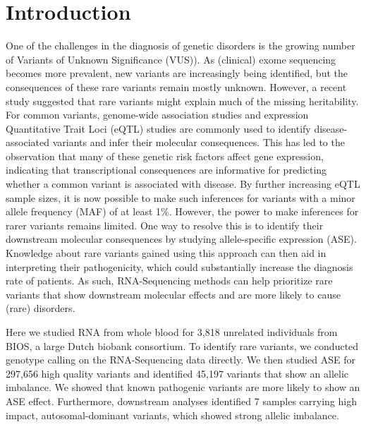 \section{Introduction}
One of the challenges in the diagnosis of genetic disorders is the growing number of Variants of Unknown Significance (VUS)\cite{hoffman-andrewsKnownUnknownChallenges2018,direstaNextgenerationSequencingApproach2018}). As (clinical) exome sequencing becomes more prevalent, new variants are increasingly being identified, but the consequences of these rare variants remain mostly unknown. However, a recent study suggested that rare variants might explain much of the missing heritability\cite{wainschteinRecoveryTraitHeritability2019}. For common variants, genome-wide association studies and expression Quantitative Trait Loci (eQTL) studies\cite{zhernakovaIdentificationContextdependentExpression2017,aguetGeneticEffectsGene2017,vosaUnravelingPolygenicArchitecture2018} are commonly used to identify disease-associated variants and infer their molecular consequences. This has led to the observation that many of these genetic risk factors affect gene expression, indicating that transcriptional consequences are informative for predicting whether a common variant is associated with disease. By further increasing eQTL sample sizes, it is now possible to make such inferences for variants with a minor allele frequency (MAF) of at least 1\%\cite{vosaUnravelingPolygenicArchitecture2018}. However, the power to make inferences for rarer variants remains limited. One way to resolve this is to identify their downstream molecular consequences by studying allele-specific expression (ASE)\cite{bombaImpactRareLowfrequency2017}. Knowledge about rare variants gained using this approach can then aid in interpreting their pathogenicity, which could substantially increase the diagnosis rate of patients\cite{macarthurGuidelinesInvestigatingCausality2014,kremerGeneticDiagnosisMendelian2017}. As such, RNA-Sequencing methods can help prioritize rare variants that show downstream molecular effects and are more likely to cause (rare) disorders.

Here we studied RNA from whole blood for 3,818 unrelated individuals from BIOS, a large Dutch biobank consortium. To identify rare variants, we conducted genotype calling on the RNA-Sequencing data directly. We then studied ASE for 297,656 high quality variants and identified 45,197 variants that show an allelic imbalance. We showed that known pathogenic variants are more likely to show an ASE effect. Furthermore, downstream analyses identified 7 samples carrying high impact, autosomal-dominant variants, which showed strong allelic imbalance.

